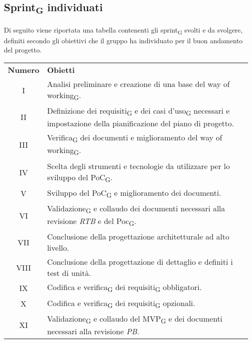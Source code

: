 \subsection{Sprint\textsubscript{G} individuati}
Di seguito viene riportata una tabella contenenti gli sprint\textsubscript{G} svolti e da svolgere, definiti secondo gli obiettivi che il gruppo ha individuato per il buon andamento del progetto.
\begin{center}
	\renewcommand\tabularxcolumn[1]{>{\Centering}m{#1}}
	\setlength\extrarowheight{5pt}
	\begin{tabularx}{\textwidth}{| c | X |} 
		\hline
		\rowcolor{white}
		\textbf{Numero} & \textbf{Obietti}\\
		I &  Analisi preliminare e creazione di una base del way of working\textsubscript{G}. \\
		II & Definizione dei requisiti\textsubscript{G} e dei casi d'uso\textsubscript{G} necessari e impostazione della pianificazione del piano di progetto. \\
		III & Verifica\textsubscript{G} dei documenti e miglioramento del way of working\textsubscript{G}. \\
		IV & Scelta degli strumenti e tecnologie da utilizzare per lo sviluppo del PoC\textsubscript{G}. \\
		V & Sviluppo del PoC\textsubscript{G} e miglioramento dei documenti. \\
		VI & Validazione\textsubscript{G} e collaudo dei documenti necessari alla revisione \textit{RTB} e del Poc\textsubscript{G}.\\
		VII & Conclusione della progettazione architetturale ad alto livello. \\
		VIII & Conclusione della progettazione di dettaglio e definiti i test di unità. \\
		IX & Codifica e verifica\textsubscript{G} dei requisiti\textsubscript{G} obbligatori. \\
		X & Codifica e verifica\textsubscript{G} dei requisiti\textsubscript{G} opzionali. \\
		XI & Validazione\textsubscript{G} e collaudo del MVP\textsubscript{G} e dei documenti necessari alla revisione \textit{PB}.\\
		\hline
	\end{tabularx}
\end{center}